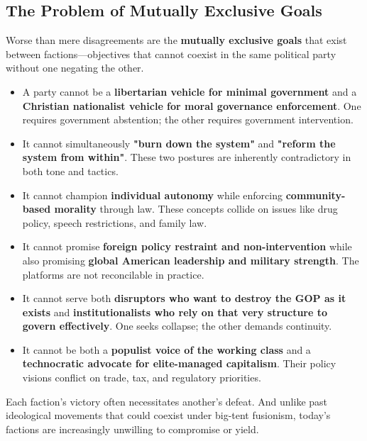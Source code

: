 \subsection{The Problem of Mutually Exclusive Goals}

Worse than mere disagreements are the \textbf{mutually exclusive goals} that exist between factions—objectives that cannot coexist in the same political party without one negating the other.

\begin{itemize}
\item A party cannot be a \textbf{libertarian vehicle for minimal government} and a \textbf{Christian nationalist vehicle for moral governance enforcement}. One requires government abstention; the other requires government intervention.

\item It cannot simultaneously \textbf{"burn down the system"} and \textbf{"reform the system from within"}. These two postures are inherently contradictory in both tone and tactics.

\item It cannot champion \textbf{individual autonomy} while enforcing \textbf{community-based morality} through law. These concepts collide on issues like drug policy, speech restrictions, and family law.

\item It cannot promise \textbf{foreign policy restraint and non-intervention} while also promising \textbf{global American leadership and military strength}. The platforms are not reconcilable in practice.

\item It cannot serve both \textbf{disruptors who want to destroy the GOP as it exists} and \textbf{institutionalists who rely on that very structure to govern effectively}. One seeks collapse; the other demands continuity.

\item It cannot be both a \textbf{populist voice of the working class} and a \textbf{technocratic advocate for elite-managed capitalism}. Their policy visions conflict on trade, tax, and regulatory priorities.

\end{itemize}

Each faction’s victory often necessitates another’s defeat. And unlike past ideological movements that could coexist under big-tent fusionism, today’s factions are increasingly unwilling to compromise or yield.

